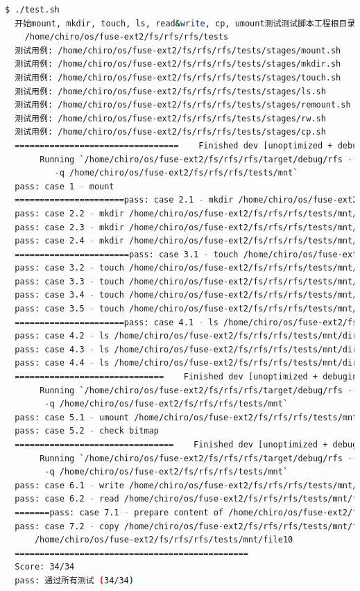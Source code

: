 \begin{lstlisting}[language=bash]
  $ ./test.sh
  开始mount, mkdir, touch, ls, read&write, cp, umount测试测试脚本工程根目录: 
    /home/chiro/os/fuse-ext2/fs/rfs/rfs/tests
  测试用例: /home/chiro/os/fuse-ext2/fs/rfs/rfs/tests/stages/mount.sh
  测试用例: /home/chiro/os/fuse-ext2/fs/rfs/rfs/tests/stages/mkdir.sh
  测试用例: /home/chiro/os/fuse-ext2/fs/rfs/rfs/tests/stages/touch.sh
  测试用例: /home/chiro/os/fuse-ext2/fs/rfs/rfs/tests/stages/ls.sh
  测试用例: /home/chiro/os/fuse-ext2/fs/rfs/rfs/tests/stages/remount.sh
  测试用例: /home/chiro/os/fuse-ext2/fs/rfs/rfs/tests/stages/rw.sh
  测试用例: /home/chiro/os/fuse-ext2/fs/rfs/rfs/tests/stages/cp.sh
  =================================    Finished dev [unoptimized + debuginfo] target(s) in 0.05s
       Running `/home/chiro/os/fuse-ext2/fs/rfs/rfs/target/debug/rfs --device=/home/chiro/ddriver 
          -q /home/chiro/os/fuse-ext2/fs/rfs/rfs/tests/mnt`
  pass: case 1 - mount
  ======================pass: case 2.1 - mkdir /home/chiro/os/fuse-ext2/fs/rfs/rfs/tests/mnt/dir0
  pass: case 2.2 - mkdir /home/chiro/os/fuse-ext2/fs/rfs/rfs/tests/mnt/dir0/dir0
  pass: case 2.3 - mkdir /home/chiro/os/fuse-ext2/fs/rfs/rfs/tests/mnt/dir0/dir0/dir0
  pass: case 2.4 - mkdir /home/chiro/os/fuse-ext2/fs/rfs/rfs/tests/mnt/dir1
  =======================pass: case 3.1 - touch /home/chiro/os/fuse-ext2/fs/rfs/rfs/tests/mnt/file0
  pass: case 3.2 - touch /home/chiro/os/fuse-ext2/fs/rfs/rfs/tests/mnt/file1
  pass: case 3.3 - touch /home/chiro/os/fuse-ext2/fs/rfs/rfs/tests/mnt/dir0/file1
  pass: case 3.4 - touch /home/chiro/os/fuse-ext2/fs/rfs/rfs/tests/mnt/dir0/file2
  pass: case 3.5 - touch /home/chiro/os/fuse-ext2/fs/rfs/rfs/tests/mnt/dir1/file3
  ======================pass: case 4.1 - ls /home/chiro/os/fuse-ext2/fs/rfs/rfs/tests/mnt/
  pass: case 4.2 - ls /home/chiro/os/fuse-ext2/fs/rfs/rfs/tests/mnt/dir0
  pass: case 4.3 - ls /home/chiro/os/fuse-ext2/fs/rfs/rfs/tests/mnt/dir0/dir1
  pass: case 4.4 - ls /home/chiro/os/fuse-ext2/fs/rfs/rfs/tests/mnt/dir0/dir1/dir2
  ==============================    Finished dev [unoptimized + debuginfo] target(s) in 0.05s
       Running `/home/chiro/os/fuse-ext2/fs/rfs/rfs/target/debug/rfs --device=/home/chiro/ddriver 
        -q /home/chiro/os/fuse-ext2/fs/rfs/rfs/tests/mnt`
  pass: case 5.1 - umount /home/chiro/os/fuse-ext2/fs/rfs/rfs/tests/mnt
  pass: case 5.2 - check bitmap
  ================================    Finished dev [unoptimized + debuginfo] target(s) in 0.06s
       Running `/home/chiro/os/fuse-ext2/fs/rfs/rfs/target/debug/rfs --device=/home/chiro/ddriver 
        -q /home/chiro/os/fuse-ext2/fs/rfs/rfs/tests/mnt`
  pass: case 6.1 - write /home/chiro/os/fuse-ext2/fs/rfs/rfs/tests/mnt/file0
  pass: case 6.2 - read /home/chiro/os/fuse-ext2/fs/rfs/rfs/tests/mnt/file0
  =======pass: case 7.1 - prepare content of /home/chiro/os/fuse-ext2/fs/rfs/rfs/tests/mnt/file9
  pass: case 7.2 - copy /home/chiro/os/fuse-ext2/fs/rfs/rfs/tests/mnt/file9 to 
      /home/chiro/os/fuse-ext2/fs/rfs/rfs/tests/mnt/file10
  =============================================== 
  Score: 34/34
  pass: 通过所有测试 (34/34)
\end{lstlisting}

